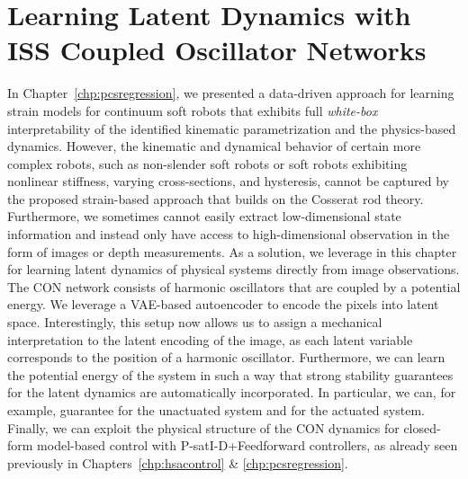 \chapter{Learning Latent Dynamics with ISS Coupled Oscillator Networks}
\label{chp:con}

\begin{foreword}
    In Chapter~\ref{chp:pcsregression}, we presented a data-driven approach for learning strain models for continuum soft robots that exhibits full \emph{white-box} interpretability of the identified kinematic parametrization and the physics-based dynamics.
    However, the kinematic and dynamical behavior of certain more complex robots, such as non-slender soft robots or soft robots exhibiting nonlinear stiffness, varying cross-sections, and hysteresis, cannot be captured by the proposed strain-based approach that builds on the Cosserat rod theory.
    Furthermore, we sometimes cannot easily extract low-dimensional state information and instead only have access to high-dimensional observation in the form of images or depth measurements.
    As a solution, we leverage in this chapter  for learning latent dynamics of physical systems directly from image observations. The \gls{CON} network consists of harmonic oscillators that are coupled by a potential energy. We leverage a \gls{VAE}-based autoencoder to encode the pixels into latent space. Interestingly, this setup now allows us to assign a mechanical interpretation to the latent encoding of the image, as each latent variable corresponds to the position of a harmonic oscillator. Furthermore, we can learn the potential energy of the system in such a way that strong stability guarantees for the latent dynamics are automatically incorporated. In particular, we can, for example, guarantee  for the unactuated system and  for the actuated system.
    Finally, we can exploit the physical structure of the \gls{CON} dynamics for closed-form model-based control with P-satI-D+Feedforward controllers, as already seen previously in Chapters~\ref{chp:hsacontrol} \& \ref{chp:pcsregression}.
\end{foreword}


